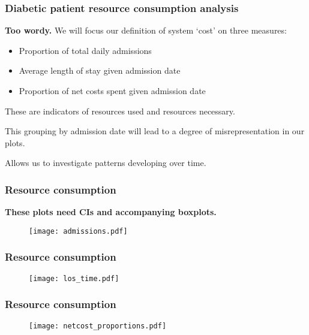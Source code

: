 \begin{frame}
    \frametitle{Diabetic patient resource consumption analysis}
    \textbf{Too wordy.}
    We will focus our definition of system `cost' on three measures:

    \pause%
    \begin{itemize}
        \item Proportion of total daily admissions
        \item Average length of stay given admission date
        \item Proportion of net costs spent given admission date
    \end{itemize}

    \pause%
    \vspace{10pt}
    These are indicators of resources used and resources necessary.

    \vspace{10pt}
    This grouping by admission date will lead to a degree of misrepresentation
    in our plots.

    \vspace{10pt}
    Allows us to investigate patterns developing over time.
\end{frame}

\begin{frame}
    \frametitle{Resource consumption}
    \textbf{These plots need CIs and accompanying boxplots.}
    \begin{figure}
    \texttt{[image: admissions.pdf]}
    \end{figure}
\end{frame}

\begin{frame}
    \frametitle{Resource consumption}

    \begin{figure}
        \texttt{[image: los\_time.pdf]}
    \end{figure}
\end{frame}

\begin{frame}
    \frametitle{Resource consumption}

    \begin{figure}
    \texttt{[image: netcost\_proportions.pdf]}
    \end{figure}
\end{frame}
